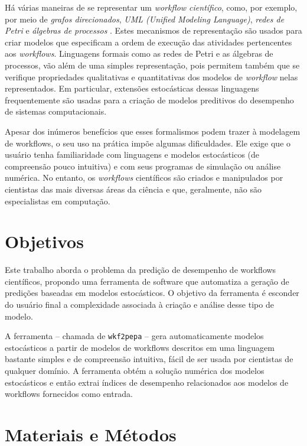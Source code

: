 \documentclass[a4paper,10pt]{article}
\begin{document}
        Há várias maneiras de se representar um \emph{workflow científico}, como, por exemplo, por meio de \emph{grafos direcionados}, \emph{UML \emph{(Unified Modeling Language)}}, \emph{redes de Petri} e \emph{álgebras de processos} \cite{phd:oga11}. Estes mecanismos de representação são usados para criar modelos que especificam a ordem de execução das atividades pertencentes aos \emph{workflows}. Linguagens formais como as redes de Petri e as álgebras de processos, vão além de uma simples representação, pois permitem também que se verifique propriedades qualitativas e quantitativas dos modelos de \emph{workflow} nelas representados. Em particular, extensões estocásticas dessas linguagens frequentemente são usadas para a criação de modelos preditivos do desempenho de sistemas computacionais.

        Apesar dos inúmeros benefícios que esses formalismos podem trazer à modelagem de workflows, o seu uso na prática impõe algumas dificuldades.  Ele exige que o usuário tenha familiaridade com linguagens e modelos estocásticos (de compreensão pouco intuitiva) e com seus programas de simulação ou análise numérica. No entanto, os \emph{workflows} científicos são criados e manipulados por cientistas das mais diversas áreas da ciência e que, geralmente, não são especialistas em computação.

    \section*{Objetivos}

    Este trabalho aborda o problema da predição de desempenho de workflows científicos, propondo uma ferramenta de software que automatiza a geração de predições baseadas em modelos estocásticos. O objetivo da ferramenta é esconder do usuário final a complexidade associada à criação e análise desse tipo de modelo.

     A ferramenta -- chamada de \texttt{wkf2pepa} -- gera automaticamente modelos estocásticos a partir de modelos de workflows descritos em uma linguagem bastante simples e de compreensão intuitiva, fácil de ser usada por cientistas de qualquer domínio. A ferramenta obtém a solução numérica dos modelos estocásticos e então extrai índices de desempenho relacionados aos modelos de workflows fornecidos como entrada.

    \section*{Materiais e Métodos}
\end{document}
